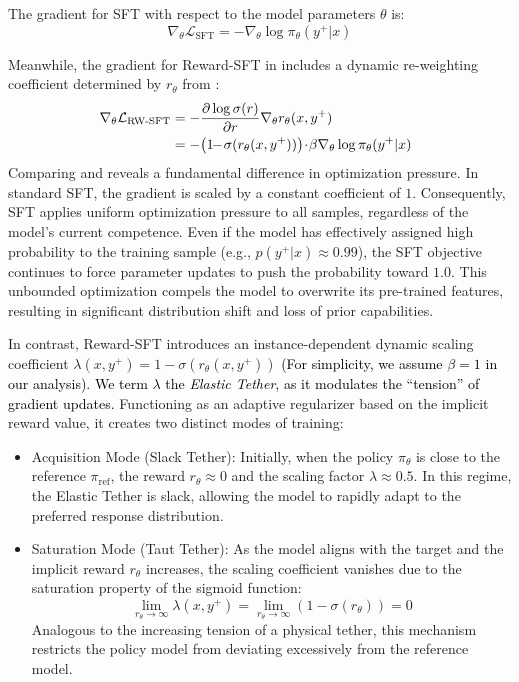 \documentclass{article}
\newcommand{\modify}[1]{\textcolor{black}{#1}} %
\theoremstyle{plain}
\theoremstyle{definition}
\theoremstyle{remark}
\begin{document}
The gradient for SFT with respect to the model parameters $\theta$ is:
\begin{equation}
\nabla_\theta \mathcal{L}_{\text{SFT}} = - \nabla_\theta \log \pi_\theta(y^+|x)
\label{eq:sft_gradient}
\end{equation}


Meanwhile, the gradient for Reward-SFT in  includes a dynamic re-weighting coefficient determined by $r_\theta$ from :
\begin{align}
\hspace{-6pt}
\nabla_\theta \mathcal{L}_{\text{RW-SFT}} &= - \frac{\partial \log \sigma(r)}{\partial r} \nabla_\theta r_\theta(x, y^+) \nonumber \\
&= - \!\left(1\!\! -\! \sigma(r_\theta(x, y^+))\right)\! \cdot \!\beta \nabla_\theta \log \pi_\theta(y^+|x)
\label{eq:reward_sft_gradient}
\end{align}
Comparing  and  reveals a fundamental difference in optimization pressure. In standard SFT, the gradient is scaled by a constant coefficient of $1$. Consequently, SFT applies uniform optimization pressure to all samples, regardless of the model's current competence. Even if the model has effectively assigned high probability to the training sample (e.g., $p(y^+|x) \approx 0.99$), the SFT objective continues to force parameter updates to push the probability toward $1.0$. This unbounded optimization compels the model to overwrite its pre-trained features, resulting in significant distribution shift and loss of prior capabilities.

In contrast, Reward-SFT introduces an instance-dependent dynamic scaling coefficient $\lambda(x, y^+) = 1 - \sigma(r_\theta(x, y^+))$ \modify{(For simplicity, we assume $\beta = 1$ in our analysis). We term $\lambda$ the \textit{Elastic Tether}, as it modulates the ``tension'' of gradient updates.} Functioning as an adaptive regularizer based on the implicit reward value, it creates two distinct modes of training:

\begin{itemize}
    \item Acquisition Mode (Slack Tether): Initially, when the policy $\pi_\theta$ is close to the reference $\pi_{\text{ref}}$, the reward $r_\theta \approx 0$ and the scaling factor $\lambda \approx 0.5$. In this regime, the Elastic Tether is slack, allowing the model to rapidly adapt to the preferred response distribution.

    \item Saturation Mode (Taut Tether): As the model aligns with the target and the implicit reward $r_\theta$ increases, the scaling coefficient vanishes due to the saturation property of the sigmoid function:
    \begin{equation}
        \lim_{r_\theta \to \infty} \lambda(x, y^+) = \lim_{r_\theta \to \infty} (1 - \sigma(r_\theta)) = 0 \nonumber
    \end{equation}
Analogous to the increasing tension of a physical tether, this mechanism restricts the policy model from deviating excessively from the reference model.
\end{itemize}
\end{document}
